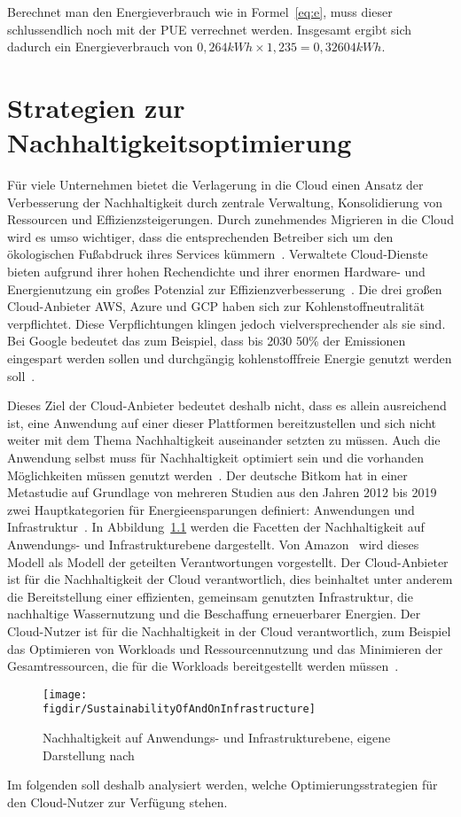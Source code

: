 Berechnet man den Energieverbrauch wie in Formel~\ref{eq:e}, muss dieser schlussendlich noch mit der \ac{PUE} verrechnet werden.
Insgesamt ergibt sich dadurch ein Energieverbrauch von $0,264 kWh \times 1,235 = 0,32604 kWh$.
\chapter{Strategien zur Nachhaltigkeitsoptimierung}\label{CAP:strategies}
\noindent Für viele Unternehmen bietet die Verlagerung in die Cloud einen Ansatz der Verbesserung der Nachhaltigkeit durch zentrale Verwaltung, Konsolidierung von Ressourcen und Effizienzsteigerungen.
Durch zunehmendes Migrieren in die Cloud wird es umso wichtiger, dass die entsprechenden Betreiber sich um den ökologischen Fußabdruck ihres Services kümmern~\cite{Buchanan.2023}.
Verwaltete Cloud-Dienste bieten aufgrund ihrer hohen Rechendichte und ihrer enormen Hardware- und Energienutzung ein großes Potenzial zur Effizienzverbesserung~\cite{Currie.2024}.
Die drei großen Cloud-Anbieter \ac{AWS}, Azure und \ac{GCP} haben sich zur Kohlenstoffneutralität verpflichtet.
Diese Verpflichtungen klingen jedoch vielversprechender als sie sind.
Bei Google bedeutet das zum Beispiel, dass bis 2030 50\% der Emissionen eingespart werden sollen und durchgängig kohlenstofffreie Energie genutzt werden soll~\cite{Google.2023}.

Dieses Ziel der Cloud-Anbieter bedeutet deshalb nicht, dass es allein ausreichend ist, eine Anwendung auf einer dieser Plattformen bereitzustellen und sich nicht weiter mit dem Thema Nachhaltigkeit auseinander setzten zu müssen.
Auch die Anwendung selbst muss für Nachhaltigkeit optimiert sein und die vorhanden Möglichkeiten müssen genutzt werden~\cite{Newman.2023}.
Der deutsche Bitkom hat in einer Metastudie auf Grundlage von mehreren Studien aus den Jahren 2012 bis 2019 zwei Hauptkategorien für Energieensparungen definiert: Anwendungen und Infrastruktur~\cite{Bieser.2020}.
In Abbildung~\ref{FIG:sustainability-infrastructure} werden die Facetten der Nachhaltigkeit auf Anwendungs- und Infrastrukturebene dargestellt.
Von Amazon~\cite{Mokhtari.2023} wird dieses Modell als Modell der geteilten Verantwortungen vorgestellt.
Der Cloud-Anbieter ist für die Nachhaltigkeit der Cloud verantwortlich, dies beinhaltet unter anderem die Bereitstellung einer effizienten, gemeinsam genutzten Infrastruktur, die nachhaltige Wassernutzung und die Beschaffung erneuerbarer Energien.
Der Cloud-Nutzer ist für die Nachhaltigkeit in der Cloud verantwortlich, zum Beispiel das Optimieren von Workloads und Ressourcennutzung und das Minimieren der Gesamtressourcen, die für die Workloads bereitgestellt werden müssen~\cite{Mokhtari.2023}.
\begin{figure}
 \caption[Nachhaltigkeit auf Anwendungs- und Infrastrukturebene]{Nachhaltigkeit auf Anwendungs- und Infrastrukturebene, eigene Darstellung nach ~\cite{Mokhtari.2023}}
 {\texttt{[image: \\figdir/SustainabilityOfAndOnInfrastructure]}}
 \label{FIG:sustainability-infrastructure}
\end{figure}
Im folgenden soll deshalb analysiert werden, welche Optimierungsstrategien für den Cloud-Nutzer zur Verfügung stehen.

